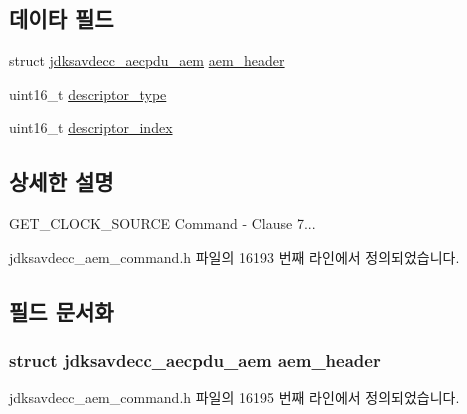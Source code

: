 \subsection*{데이타 필드}
\begin{DoxyCompactItemize}
\item 
struct \hyperlink{structjdksavdecc__aecpdu__aem}{jdksavdecc\+\_\+aecpdu\+\_\+aem} \hyperlink{structjdksavdecc__aem__command__get__clock__source_ae1e77ccb75ff5021ad923221eab38294}{aem\+\_\+header}
\item 
uint16\+\_\+t \hyperlink{structjdksavdecc__aem__command__get__clock__source_ab7c32b6c7131c13d4ea3b7ee2f09b78d}{descriptor\+\_\+type}
\item 
uint16\+\_\+t \hyperlink{structjdksavdecc__aem__command__get__clock__source_a042bbc76d835b82d27c1932431ee38d4}{descriptor\+\_\+index}
\end{DoxyCompactItemize}


\subsection{상세한 설명}
G\+E\+T\+\_\+\+C\+L\+O\+C\+K\+\_\+\+S\+O\+U\+R\+CE Command -\/ Clause 7... 

jdksavdecc\+\_\+aem\+\_\+command.\+h 파일의 16193 번째 라인에서 정의되었습니다.



\subsection{필드 문서화}
\subsubsection[{\texorpdfstring{aem\+\_\+header}{aem_header}}]{\setlength{\rightskip}{0pt plus 5cm}struct {\bf jdksavdecc\+\_\+aecpdu\+\_\+aem} aem\+\_\+header}\hypertarget{structjdksavdecc__aem__command__get__clock__source_ae1e77ccb75ff5021ad923221eab38294}{}\label{structjdksavdecc__aem__command__get__clock__source_ae1e77ccb75ff5021ad923221eab38294}


jdksavdecc\+\_\+aem\+\_\+command.\+h 파일의 16195 번째 라인에서 정의되었습니다.


